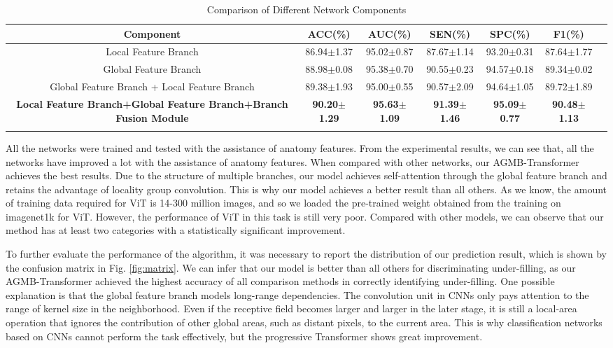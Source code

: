 \documentclass[journal]{IEEEtran}
\begin{document}
\begin{table*}[ht]
\centering
\renewcommand\arraystretch{1.2}
\caption{Comparison of Different Network Components}
\begin{tabular}{c|cccccc}
\Xhline{1pt}
Component   & ACC(\%)&AUC(\%) & SEN(\%) & SPC(\%) & F1(\%)   \\ \hline
Local Feature Branch & 86.94$\pm$1.37   & 95.02$\pm$0.87   & 87.67$\pm$1.14   & 93.20$\pm$0.31   & 87.64$\pm$1.77   \\ \hline
Global Feature Branch & 88.98$\pm$0.08   & 95.38$\pm$0.70   & 90.55$\pm$0.23   & 94.57$\pm$0.18   & 89.34$\pm$0.02   \\ \hline
Global Feature Branch + Local Feature Branch & 89.38$\pm$1.93  & 95.00$\pm$0.55 & 90.57$\pm$2.09  & 94.64$\pm$1.05  & 89.72$\pm$1.89 \\ \hline
\textbf{Local Feature Branch+Global Feature Branch+Branch Fusion Module}      & \textbf{90.20$\pm$1.29} & \textbf{95.63$\pm$1.09}    & \textbf{91.39$\pm$1.46} & \textbf{95.09$\pm$0.77} & \textbf{90.48$\pm$1.13}     \\ \Xhline{1pt}
\end{tabular}
\label{tab6}
\end{table*}


All the networks were trained and tested with the assistance of anatomy features. 
From the experimental results, we can see that, all the networks have improved a lot with the assistance of anatomy features. When compared with other networks, our AGMB-Transformer achieves the best results. Due to the structure of multiple branches, our model achieves self-attention through the global feature branch and retains the advantage of locality group convolution. This is why our model achieves a better result than all others. As we know, the amount of training data required for ViT is 14-300 million images, and so we loaded the pre-trained weight obtained from the training on imagenet1k for ViT. However, the performance of ViT in this task is still very poor. Compared with other models, we can observe that our method has at least two categories with a statistically significant improvement.



To further evaluate the performance of the algorithm, it was necessary to report the distribution of our prediction result, which is shown by the confusion matrix in \textcolor[rgb]{0,0.541,0.855}{Fig. \ref{fig:matrix}}. We can infer that our model is better than all others for discriminating under-filling, as our AGMB-Transformer achieved the highest accuracy of all comparison methods in correctly identifying under-filling. One possible explanation is that the global feature branch models long-range dependencies. The convolution unit in CNNs only pays attention to the range of kernel size in the neighborhood. Even if the receptive field becomes larger and larger in the later stage, it is still a local-area operation that ignores the contribution of other global areas, such as distant pixels, to the current area. This is why classification networks based on CNNs cannot perform the task effectively, but the progressive Transformer shows great improvement.
\end{document}
